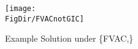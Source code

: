 \hypertarget{FVACnotGIC}{}
\begin{figure}[tbp]
\centerline{\texttt{[image: \\FigDir/FVACnotGIC]}}
\caption{Example Solution under \{{FVAC},\}}
\label{fig:FVACnotGIC}
\end{figure}
